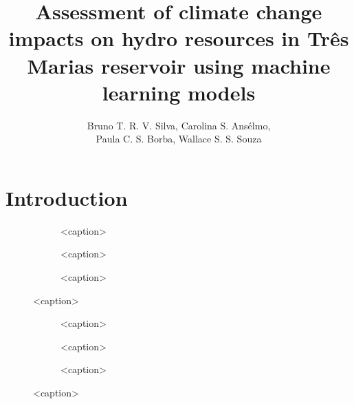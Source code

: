 \documentclass[12pt]{article}
\title{Assessment of climate change impacts on hydro resources in Três Marias reservoir using machine learning models}
\author{%
    Bruno T. R. V. Silva\inst{1}, %
    Carolina S. Ansélmo\inst{1}, \\%
    Paula C. S. Borba\inst{1}, %
    Wallace S. S. Souza\inst{1}%
}
\begin{document}
\maketitle



\section{Introduction}



\begin{figure}[htbp]
    {\centering
    \begin{subfigure}[b]{.49\textwidth}
        \centering
        
        \caption{<caption>}
    \end{subfigure}
    \begin{subfigure}[b]{.49\textwidth}
        \centering
        
        \caption{<caption>}
    \end{subfigure}}

    \begin{subfigure}[b]{.49\textwidth}
        \centering
        
        \caption{<caption>}
    \end{subfigure}
    \caption{<caption>}
    \label{<label>}
\end{figure}

\begin{figure}[htbp]
    {\centering
    \begin{subfigure}[b]{.49\textwidth}
        \centering
        
        \caption{<caption>}
    \end{subfigure}
    \begin{subfigure}[b]{.49\textwidth}
        \centering
        
        \caption{<caption>}
    \end{subfigure}}

    \begin{subfigure}[b]{.49\textwidth}
        \centering
        
        \caption{<caption>}
    \end{subfigure}
    \caption{<caption>}
    \label{<label1>}
\end{figure}









\end{document}
